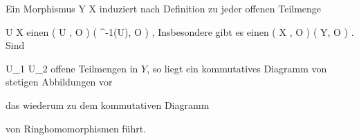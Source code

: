 {}
{





Ein Morphismus
\maabbdisp {{\psi}} { Y } { X
} {}
induziert nach Definition zu jeder offenen Teilmenge

\mavergleichskette
{\vergleichskette
{ U
}
{ \subseteq }{ X
}
{  }{
}
{    }{
}
{   }{
}
}
{}{}{}
einen
\maabbdisp {\tilde{\psi}} { \Gamma ( U , {\mathcal O} ) } { \Gamma ( {\psi}^{-1}(U), {\mathcal O} )
} {,}
Insbesondere gibt es einen  {}
\maabbdisp {\tilde{\psi}} { \Gamma ( X , {\mathcal O} ) } { \Gamma ( Y, {\mathcal O} )
} {.}
Sind

\mavergleichskette
{\vergleichskette
{ U_1
}
{ \subseteq }{ U_2
}
{  }{
}
{    }{
}
{   }{
}
}
{}{}{}
offene Teilmengen in $Y$, so liegt ein kommutatives Diagramm von stetigen Abbildungen vor
 {} {}

 {  }




das wiederum zu dem kommutativen Diagramm

 {  }

von Ringhomomorphismen führt.





}

